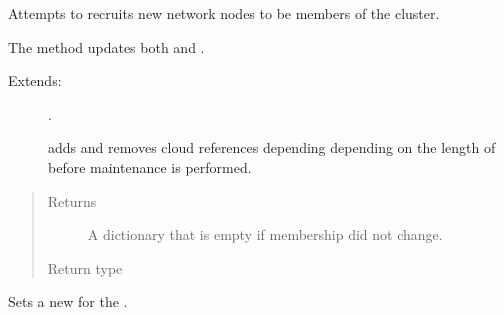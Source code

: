 \documentclass[letterpaper,10pt,english]{sphinxmanual}
\begin{document}
\begin{fulllineitems}

\begin{fulllineitems}
\label{\detokenize{app.domain:app.domain.cluster_groups.SGCluster.membership_maintenance}}
Attempts to recruits new network nodes to be members of the cluster.

The method updates both  and .
\begin{description}
\item[{Extends:}] \leavevmode
{\hyperref[\detokenize{app.domain:app.domain.cluster_groups.Cluster.membership_maintenance}]{}}.

 adds and removes cloud
references depending depending on the length of {\hyperref[\detokenize{app.domain:app.domain.cluster_groups.Cluster.members}]{}}
before maintenance is performed.

\end{description}
\begin{quote}\begin{description}
\item[{Returns}] \leavevmode
A dictionary that is empty if membership did not change.

\item[{Return type}] \leavevmode
{\hyperref[\detokenize{app:app.type_hints.NodeDict}]{}}

\end{description}\end{quote}

\end{fulllineitems}


\begin{fulllineitems}
\label{\detokenize{app.domain:app.domain.cluster_groups.SGCluster.new_desired_distribution}}
Sets a new {\hyperref[\detokenize{app.domain:app.domain.cluster_groups.SGCluster.v_}]{}} for the
.


\end{fulllineitems}
\end{fulllineitems}
\end{document}

